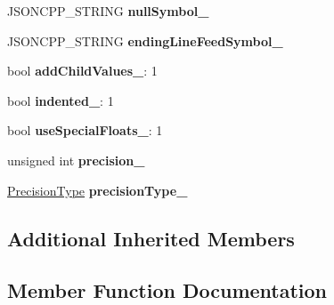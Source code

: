 \begin{DoxyCompactItemize}
\item 
\mbox{\label{structJson_1_1BuiltStyledStreamWriter_a6ccceadf4b1286a519a175cb59cb61d5}} 
J\+S\+O\+N\+C\+P\+P\+\_\+\+S\+T\+R\+I\+NG {\bfseries null\+Symbol\+\_\+}
\item 
\mbox{\label{structJson_1_1BuiltStyledStreamWriter_a5e61a9a4b2af52b98900286c843b86f7}} 
J\+S\+O\+N\+C\+P\+P\+\_\+\+S\+T\+R\+I\+NG {\bfseries ending\+Line\+Feed\+Symbol\+\_\+}
\item 
\mbox{\label{structJson_1_1BuiltStyledStreamWriter_abed9cc31da503b48798e7cea68c42e16}} 
bool {\bfseries add\+Child\+Values\+\_\+}\+: 1
\item 
\mbox{\label{structJson_1_1BuiltStyledStreamWriter_a6aa0ad023e623f600103631a6bca6d10}} 
bool {\bfseries indented\+\_\+}\+: 1
\item 
\mbox{\label{structJson_1_1BuiltStyledStreamWriter_a6f1b8694b4eb17ab8c34f6d6dd8c8a4a}} 
bool {\bfseries use\+Special\+Floats\+\_\+}\+: 1
\item 
\mbox{\label{structJson_1_1BuiltStyledStreamWriter_a6373d8d0ae4741b64e3904e4db0eef46}} 
unsigned int {\bfseries precision\+\_\+}
\item 
\mbox{\label{structJson_1_1BuiltStyledStreamWriter_a72a7b3fd5431a6f3c5abe64c990110b3}} 
\hyperlink{namespaceJson_af6e1447a3c43e3a62e11050dd0a11ce8}{Precision\+Type} {\bfseries precision\+Type\+\_\+}
\end{DoxyCompactItemize}
\subsection*{Additional Inherited Members}


\subsection{Member Function Documentation}
\mbox{\label{structJson_1_1BuiltStyledStreamWriter_a823cdb1afabb6b0d5f39bcd5a6a6f747}} 
